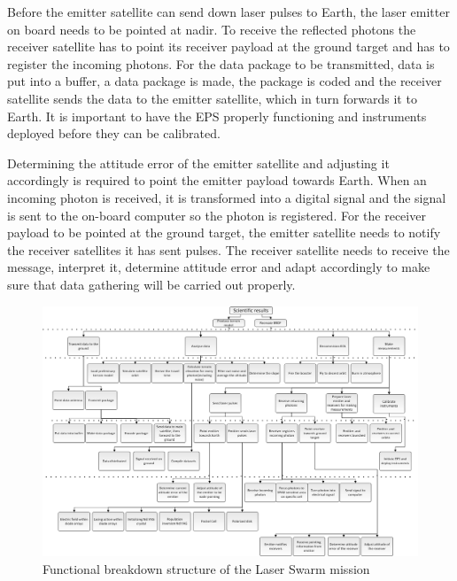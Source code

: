 Before the emitter satellite can send down laser pulses to Earth, the laser emitter on board needs to be pointed at nadir. To receive the reflected photons the receiver satellite has to point its receiver payload at the ground target and has to register the incoming photons. For the data package to be transmitted, data is put into a buffer, a data package is made, the package is coded and the receiver satellite sends the data to the emitter satellite, which in turn forwards it to Earth. It is important to have the \ac{EPS} properly functioning and instruments deployed before they can be calibrated.

Determining the attitude error of the emitter satellite and adjusting  it accordingly is required to point the emitter payload towards Earth. When an incoming photon is received, it is transformed into a digital signal and the signal is sent to the on-board computer so the photon is registered. For the receiver payload to be pointed at the ground target, the emitter satellite needs to notify the receiver satellites it has sent pulses. The receiver satellite needs to receive the message, interpret it, determine attitude error and adapt accordingly to make sure that data gathering will be carried out properly. 

\begin{landscape}
\begin{figure}[ht!]
\centering
\includegraphics[width=1.3\textheight]{chapters/img/FBD.jpg}
\caption{Functional breakdown structure of the Laser Swarm mission}
\label{FBS}
\end{figure}
\end{landscape}


